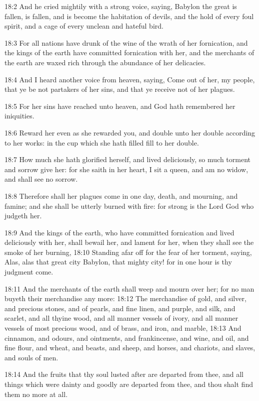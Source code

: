 18:2 And he cried mightily with a strong voice, saying, Babylon the
great is fallen, is fallen, and is become the habitation of devils,
and the hold of every foul spirit, and a cage of every unclean and
hateful bird.

18:3 For all nations have drunk of the wine of the wrath of her
fornication, and the kings of the earth have committed fornication
with her, and the merchants of the earth are waxed rich through the
abundance of her delicacies.

18:4 And I heard another voice from heaven, saying, Come out of her,
my people, that ye be not partakers of her sins, and that ye receive
not of her plagues.

18:5 For her sins have reached unto heaven, and God hath remembered
her iniquities.

18:6 Reward her even as she rewarded you, and double unto her double
according to her works: in the cup which she hath filled fill to her
double.

18:7 How much she hath glorified herself, and lived deliciously, so
much torment and sorrow give her: for she saith in her heart, I sit a
queen, and am no widow, and shall see no sorrow.

18:8 Therefore shall her plagues come in one day, death, and mourning,
and famine; and she shall be utterly burned with fire: for strong is
the Lord God who judgeth her.

18:9 And the kings of the earth, who have committed fornication and
lived deliciously with her, shall bewail her, and lament for her, when
they shall see the smoke of her burning, 18:10 Standing afar off for
the fear of her torment, saying, Alas, alas that great city Babylon,
that mighty city! for in one hour is thy judgment come.

18:11 And the merchants of the earth shall weep and mourn over her;
for no man buyeth their merchandise any more: 18:12 The merchandise of
gold, and silver, and precious stones, and of pearls, and fine linen,
and purple, and silk, and scarlet, and all thyine wood, and all manner
vessels of ivory, and all manner vessels of most precious wood, and of
brass, and iron, and marble, 18:13 And cinnamon, and odours, and
ointments, and frankincense, and wine, and oil, and fine flour, and
wheat, and beasts, and sheep, and horses, and chariots, and slaves,
and souls of men.

18:14 And the fruits that thy soul lusted after are departed from
thee, and all things which were dainty and goodly are departed from
thee, and thou shalt find them no more at all.

